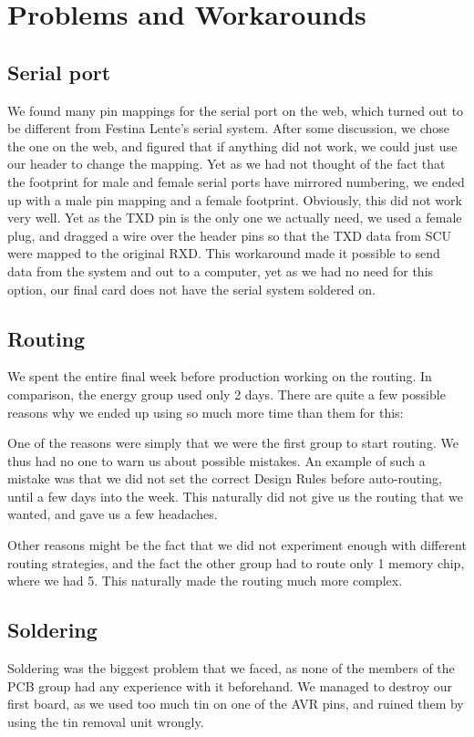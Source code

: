 \section {Problems and Workarounds}
\subsection{Serial port}
We found many pin mappings for the serial port on the web, which turned out to
be different from Festina Lente's serial system. After some discussion, we chose
the one on the web, and figured that if anything did not work, we could just
use our header to change the mapping.  Yet as we had not thought of the fact
that the footprint for male and female serial ports have mirrored numbering,
we ended up with a male pin mapping and a female footprint.  Obviously,
this did not work very well. Yet as the TXD pin is the only one we actually
need, we used a female plug, and dragged a wire over the header pins so that
the TXD data from SCU were mapped to the original RXD. This workaround made it
possible to send data from the system and out to a computer, yet as we had no
need for this option, our final card does not have the serial system soldered on.

\subsection{Routing}
We spent the entire final week before production working on the routing. In comparison, the energy group used only 2 days. There are quite a few possible reasons why we ended up using so much more time than them for this:

One of the reasons were simply that we were the first group to start routing. We thus had no one to warn us about possible mistakes. An example of such a mistake was that we did not set the correct Design Rules before auto-routing, until a few days into the week. This naturally did not give us the routing that we wanted, and gave us a few headaches.

Other reasons might be the fact that we did not experiment enough with different routing strategies, and the fact the other group had to route only 1 memory chip, where we had 5. This naturally made the routing much more complex.

\subsection{Soldering}
Soldering was the biggest problem that we faced, as none of the members of the
\ac{PCB} group had any experience with it beforehand. We managed to
destroy our first board, as we used too much tin on one of the AVR pins, and
ruined them by using the tin removal unit wrongly.

